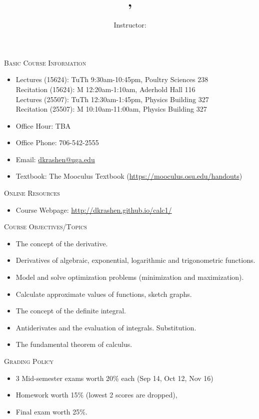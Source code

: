 \documentclass[12pt]{amsart}
\title{\course, \semester}
\author{Instructor: \instructor}
\makeatletter
\newcommand{\schedule}{
Lectures (15624): TuTh 9:30am-10:45pm, Poultry Sciences 238 \\
Recitation (15624): M 12:20am-1:10am, Aderhold Hall 116 \\
Lectures (25507): TuTh 12:30am-1:45pm, Physics Building 327 \\
Recitation (25507): M 10:10am-11:00am, Physics Building 327
}
\newcommand{\officehour}{Office Hour: TBA}
\newcommand{\phone}{706-542-2555}
\newcommand{\emailaddr}{dkrashen@uga.edu}
\newcommand{\textbook}{{The Mooculus Textbook}
(\url{https://mooculus.osu.edu/handouts})}
\newcommand{\website}{http://dkrashen.github.io/calc1/}
\makeatother
\begin{document}
\maketitle


\thispagestyle{empty}
\noindent
\textsc{Basic Course Information}

\begin{itemize}
\item
\schedule
\item 
\officehour
\item
Office Phone: \phone
\item
Email: \url{\emailaddr}
\item
Textbook: \textbook
\end{itemize}

\medskip

\noindent
\textsc{Online Resources}

\begin{itemize}
\item
Course Webpage:  
\url{\website} 
\end{itemize}

\medskip

\noindent
\textsc{Course Objectives/Topics}

\begin{itemize}
\item
The concept of the derivative.
\item
Derivatives of algebraic, exponential, logarithmic and trigonometric
functions.
\item
Model and solve optimization problems (minimization and
maximization).
\item
Calculate approximate values of functions, sketch graphs.
\item
The concept of the definite integral.
\item
Antiderivates and the evaluation of integrals. Substitution. 
\item
The fundamental theorem of calculus.
\end{itemize}

\medskip

\noindent
\textsc{Grading Policy}

\begin{itemize}
\item
3 Mid-semester exams worth 20\% each (Sep 14, Oct 12, Nov 16)
\item
Homework worth 15\% (lowest 2 scores are dropped), 
\item
Final exam worth 25\%.
\end{itemize}
\end{document}
